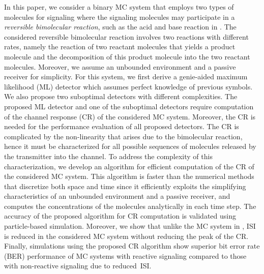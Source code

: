 \documentclass[conference]{IEEEtran}
\begin{document}
In this paper, we consider a binary MC system that employs two types of molecules for signaling where the signaling molecules may participate in a \textit{reversible bimolecular reaction}, such as the acid and base reaction in \cite{Nariman_Acid}. The considered reversible bimolecular reaction involves two reactions with different rates, namely the reaction of two reactant molecules that yields a product molecule and the decomposition of this product molecule into the two reactant molecules. 
 Moreover, we assume an unbounded environment and a passive receiver for simplicity. For this system, we first derive a genie-aided maximum likelihood (ML) detector which assumes perfect knowledge of previous symbols. We also propose two suboptimal detectors with different complexities. The proposed ML detector and one of the suboptimal detectors require computation of the channel response (CR) of the considered MC system. Moreover, the CR is needed for the performance evaluation of all proposed detectors. 
The CR is complicated by the non-linearity that arises due to the bimolecular reaction, hence it must be characterized for all possible sequences of molecules released by the transmitter into the channel. To address the complexity of this characterization, we develop an  algorithm for efficient computation of the CR of the considered MC system. This algorithm is faster than the numerical methods that discretize both space and time since it efficiently exploits the simplifying characteristics of an unbounded environment and a passive receiver,  and computes the concentrations of the molecules analytically in each time step.  The accuracy of the proposed algorithm for CR computation is validated using particle-based simulation. Moreover, we show that unlike the MC system in \cite{Adam_Enzyme},  ISI is reduced in the considered MC system without reducing the peak of the CR. Finally, simulations using the proposed CR algorithm show superior bit error rate (BER) performance of MC systems with reactive signaling compared to those with non-reactive signaling due to reduced~ISI. 

\end{document}
